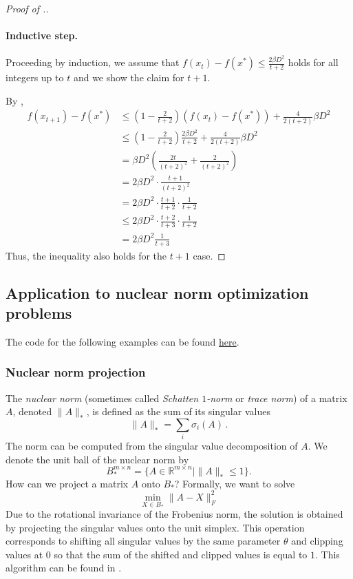 \begin{proof}[Proof of .]
\paragraph{Inductive step.}
Proceeding by induction,
we assume that $f(x_t)-f(x^*) \leq \frac{2\beta D^2}{t+2}$ holds for all
integers up to $t$ and we show the claim for $t+1.$

By ,
\begin{align*} f(x_{t+1})-f(x^*) &\leq \left(1- \frac{2}{t+2}\right) (f(x_t)-f(x^*))+ \frac{4}{2(t+2)} \beta D^2 \\
& \leq \left(1- \frac{2}{t+2}\right)\frac{2\beta D^2}{t+2}
+ \frac{4}{2(t+2)} \beta D^2 \\
& = \beta D^2 \left(\frac{2t}{(t+2)^2}+\frac{2}{(t+2)^2}\right) \\
& = 2\beta D^2 \cdot\frac{t+1}{(t+2)^2} \\
& = 2\beta D^2 \cdot\frac{t+1}{t+2}\cdot\frac{1}{t+2} \\
& \leq 2\beta D^2 \cdot\frac{t+2}{t+3}\cdot\frac{1}{t+2} \\
& = 2\beta D^2 \frac{1}{t+3}
\end{align*}
Thus, the inequality also holds for the $t+1$ case.

\end{proof}

\subsection{Application to nuclear norm optimization problems}

The code for the following examples can be found \href{https://ee227c.github.io/code/lecture5.html}{here}.

\subsubsection{Nuclear norm projection}
The \textit{nuclear norm} (sometimes called \textit{Schatten $1$-norm} or \textit{trace norm}) of a matrix $A$, denoted $\|A\|_*$, is defined as the sum of its singular values
\[
\|A\|_* = \sum_i \sigma_i(A)\,.
\]
The norm can be computed from the singular value decomposition of $A$.
We denote the unit ball of the nuclear norm by 
\[
B_*^{m\times n}=\{A\in\mathbb{R}^{m\times n} \mid \|A\|_*\le 1\}.
\]
How can we project a matrix $A$ onto $B_*$? Formally, we want to solve
\[
\min_{X\in B_*}\|A-X\|_F^2
\]
Due to the rotational invariance of the Frobenius norm, the solution is obtained by projecting the singular values onto the unit simplex. This operation corresponds to shifting all singular values by the same parameter $\theta$ and clipping values at $0$ so that the sum of the shifted and clipped values is equal to $1$. This algorithm can be found in \cite{Duchi2008}.

